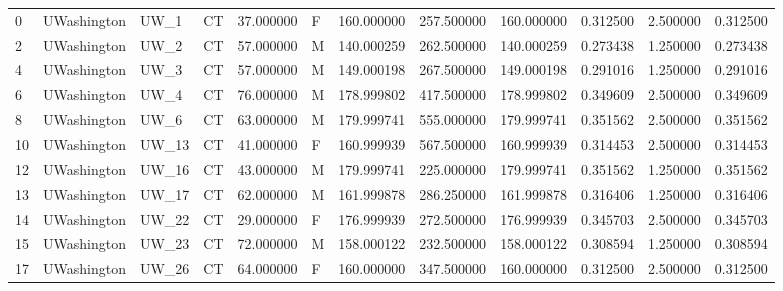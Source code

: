\begin{tabular}{llllrlrrrrrr}
0      &     UWashington &         UW\_1 &                 CT &  37.000000 &        F &       160.000000 &    257.500000 &  160.000000 &               0.312500 &            2.500000 &          0.312500 \\
2      &     UWashington &         UW\_2 &                 CT &  57.000000 &        M &       140.000259 &    262.500000 &  140.000259 &               0.273438 &            1.250000 &          0.273438 \\
4      &     UWashington &         UW\_3 &                 CT &  57.000000 &        M &       149.000198 &    267.500000 &  149.000198 &               0.291016 &            1.250000 &          0.291016 \\
6      &     UWashington &         UW\_4 &                 CT &  76.000000 &        M &       178.999802 &    417.500000 &  178.999802 &               0.349609 &            2.500000 &          0.349609 \\
8      &     UWashington &         UW\_6 &                 CT &  63.000000 &        M &       179.999741 &    555.000000 &  179.999741 &               0.351562 &            2.500000 &          0.351562 \\
10     &     UWashington &        UW\_13 &                 CT &  41.000000 &        F &       160.999939 &    567.500000 &  160.999939 &               0.314453 &            2.500000 &          0.314453 \\
12     &     UWashington &        UW\_16 &                 CT &  43.000000 &        M &       179.999741 &    225.000000 &  179.999741 &               0.351562 &            1.250000 &          0.351562 \\
13     &     UWashington &        UW\_17 &                 CT &  62.000000 &        M &       161.999878 &    286.250000 &  161.999878 &               0.316406 &            1.250000 &          0.316406 \\
14     &     UWashington &        UW\_22 &                 CT &  29.000000 &        F &       176.999939 &    272.500000 &  176.999939 &               0.345703 &            2.500000 &          0.345703 \\
15     &     UWashington &        UW\_23 &                 CT &  72.000000 &        M &       158.000122 &    232.500000 &  158.000122 &               0.308594 &            1.250000 &          0.308594 \\
17     &     UWashington &        UW\_26 &                 CT &  64.000000 &        F &       160.000000 &    347.500000 &  160.000000 &               0.312500 &            2.500000 &          0.312500 \\

\end{tabular}
